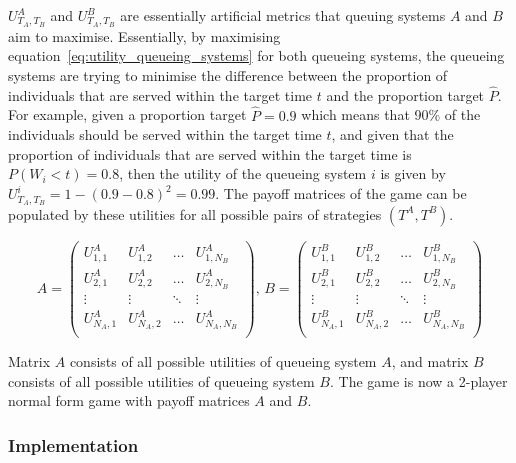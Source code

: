 \(U_{T_A, T_B}^A\) and \(U_{T_A, T_B}^B\) are essentially artificial metrics
that queuing systems \(A\) and \(B\) aim to maximise.
Essentially, by maximising equation~\eqref{eq:utility_queueing_systems} for both
queueing systems, the queueing systems are trying to minimise the difference
between the proportion of individuals that are served within the target time
\(t\) and the proportion target \(\hat{P}\).
For example, given a proportion target \(\hat{P} = 0.9\) which means that
90\% of the individuals should be served within the target time \(t\), and
given that the proportion of individuals that are served within the target time
is \(P(W_i < t) = 0.8\), then the utility of the queueing system \(i\) is
given by \(U_{T_A, T_B}^i = 1 - (0.9 - 0.8)^2 = 0.99\).
The payoff matrices of the game can be populated by these utilities for all
possible pairs of strategies \((T^A, T^B)\).

\begin{equation}\label{eq:payoff_matrices}
    A =
    \begin{pmatrix}
        U_{1,1}^A & U_{1,2}^A & \dots & U_{1,N_B}^A \\
        U_{2,1}^A & U_{2,2}^A & \dots & U_{2,N_B}^A \\
        \vdots & \vdots & \ddots & \vdots \\
        U_{N_A,1}^A & U_{N_A,2}^A & \dots & U_{N_A,N_B}^A \\
    \end{pmatrix}, \,
    B =
    \begin{pmatrix}
        U_{1,1}^B & U_{1,2}^B & \dots & U_{1,N_B}^B \\
        U_{2,1}^B & U_{2,2}^B & \dots & U_{2,N_B}^B \\
        \vdots & \vdots & \ddots & \vdots \\
        U_{N_A,1}^B & U_{N_A,2}^B & \dots & U_{N_A,N_B}^B \\
    \end{pmatrix}
\end{equation}

Matrix \(A\) consists of all possible utilities of queueing system \(A\), and
matrix \(B\) consists of all possible utilities of queueing system \(B\).
The game is now a 2-player normal form game with payoff matrices \(A\) and
\(B\).


\subsubsection{Implementation}

